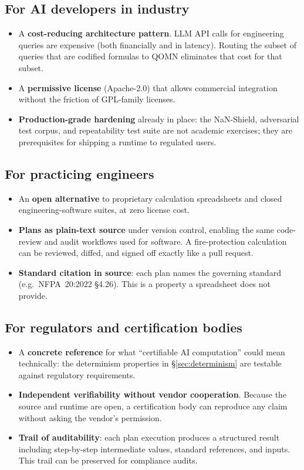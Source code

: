 \documentclass[11pt,a4paper]{article}
\begin{document}
\subsection{For AI developers in industry}

\begin{itemize}[leftmargin=*]
\item A \textbf{cost-reducing architecture pattern}. LLM API calls for engineering queries are expensive (both financially and in latency). Routing the subset of queries that are codified formulas to QOMN eliminates that cost for that subset.
\item A \textbf{permissive license} (Apache-2.0) that allows commercial integration without the friction of GPL-family licenses.
\item \textbf{Production-grade hardening} already in place: the NaN-Shield, adversarial test corpus, and repeatability test suite are not academic exercises; they are prerequisites for shipping a runtime to regulated users.
\end{itemize}

\subsection{For practicing engineers}

\begin{itemize}[leftmargin=*]
\item An \textbf{open alternative} to proprietary calculation spreadsheets and closed engineering-software suites, at zero license cost.
\item \textbf{Plans as plain-text source} under version control, enabling the same code-review and audit workflows used for software. A fire-protection calculation can be reviewed, diffed, and signed off exactly like a pull request.
\item \textbf{Standard citation in source}: each plan names the governing standard (e.g.\ NFPA~20:2022 \S{}4.26). This is a property a spreadsheet does not provide.
\end{itemize}

\subsection{For regulators and certification bodies}

\begin{itemize}[leftmargin=*]
\item A \textbf{concrete reference} for what ``certifiable AI computation'' could mean technically: the determinism properties in \S\ref{sec:determinism} are testable against regulatory requirements.
\item \textbf{Independent verifiability without vendor cooperation}. Because the source and runtime are open, a certification body can reproduce any claim without asking the vendor's permission.
\item \textbf{Trail of auditability}: each plan execution produces a structured result including step-by-step intermediate values, standard references, and inputs. This trail can be preserved for compliance audits.
\end{itemize}
\end{document}
